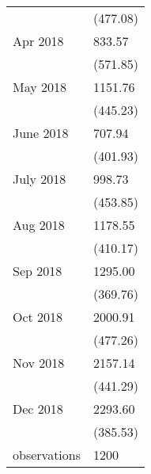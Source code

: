 \begin{tabular}{ll}
                &     (477.08) \\
Apr 2018        &       833.57 \\
                &     (571.85) \\
May 2018        &      1151.76 \\
                &     (445.23) \\
June 2018       &       707.94 \\
                &     (401.93) \\
July 2018       &       998.73 \\
                &     (453.85) \\
Aug 2018        &      1178.55 \\
                &     (410.17) \\
Sep 2018        &      1295.00 \\
                &     (369.76) \\
Oct 2018        &      2000.91 \\
                &     (477.26) \\
Nov 2018        &      2157.14 \\
                &     (441.29) \\
Dec 2018        &      2293.60 \\
                &     (385.53) \\
observations    &         1200 \\
\bottomrule
\end{tabular}
